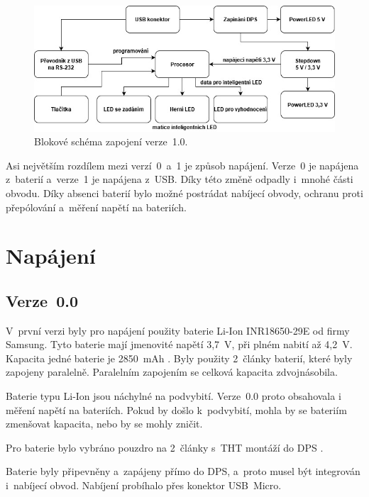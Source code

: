   \begin{figure}[!h]
    \begin{center}
      \includegraphics[scale=0.5]{obrazky/v1_blokove_schema.jpg}
    \end{center}
    \caption[Blokové schéma zapojení verze~1.0]{Blokové schéma zapojení verze~1.0.}
  \end{figure}

  Asi největším rozdílem mezi verzí~0~a~1 je způsob napájení. Verze~0 je napájena z~baterií a~verze~1 je napájena z~USB. Díky této změně 
  odpadly i~mnohé části obvodu. Díky absenci baterií bylo možné postrádat nabíjecí obvody, ochranu proti přepólování a~měření napětí 
  na bateriích.       

  \section{Napájení}
  \subsection{Verze~0.0}
  V~první verzi byly pro napájení použity baterie Li-Ion INR18650-29E od firmy Samsung. Tyto baterie mají jmenovité napětí 3,7~V, 
  při plném nabití až 4,2~V. Kapacita jedné baterie je 2850~mAh \cite{18650}. Byly použity 2~články baterií, které byly zapojeny paralelně. 
  Paralelním zapojením se celková kapacita zdvojnásobila.

  Baterie typu Li-Ion jsou náchylné na podvybití. Verze~0.0 proto obsahovala i měření napětí na bateriích. Pokud by došlo k~podvybití, mohla 
  by se bateriím zmenšovat kapacita, nebo by se mohly zničit. 

  Pro baterie bylo vybráno pouzdro na 2~články s~THT montáží do DPS \cite{18650_pouzdro}.

  Baterie byly připevněny a~zapájeny přímo do DPS, a~proto musel být integrován i~nabíjecí obvod. Nabíjení probíhalo přes konektor USB~Micro.

